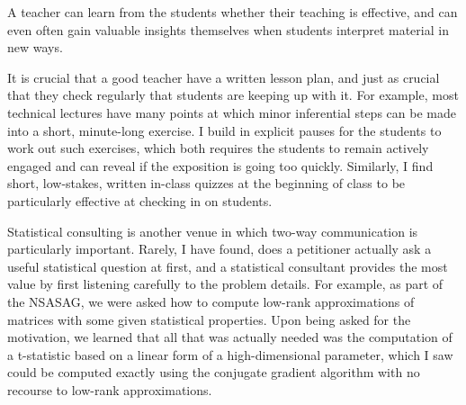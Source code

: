 A teacher can learn from the students whether their teaching is effective, and
can even often gain valuable insights themselves when students interpret
material in new ways.

It is crucial that a good teacher have a written lesson plan, and just as
crucial that they check regularly that students are keeping up with it. For
example, most technical lectures have many points at which minor inferential
steps can be made into a short, minute-long exercise. I build in explicit pauses
for the students to work out such exercises, which both requires the students to
remain actively engaged and can reveal if the exposition is going too quickly.
Similarly, I find short, low-stakes, written in-class quizzes at the beginning
of class to be particularly effective at checking in on students.

Statistical consulting is another venue in which two-way communication is
particularly important.  Rarely, I have found, does a petitioner actually ask a
useful statistical question at first, and a statistical consultant provides the
most value by first listening carefully to the problem details.  For example, as
part of the NSASAG, we were asked how to compute low-rank approximations of
matrices with some given statistical properties.  Upon being asked for the
motivation, we learned that all that was actually needed was the computation of
a t-statistic based on a linear form of a high-dimensional parameter, which I
saw could be computed exactly using the conjugate gradient algorithm with no
recourse to low-rank approximations.




